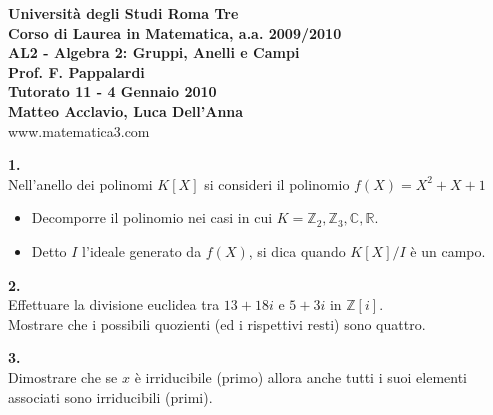\documentclass[italian,a4paper,11pt]
{article}
\newcommand{\Z}{\mathbb Z}
\newcommand{\R}{\mathbb{R}}
\newcommand{\C}{\mathbb{C}}
\newcommand{\acc}{\`}
\begin{document}
\begin{center}

\textbf{Universit\`a degli Studi Roma Tre}\\

\textbf{Corso di Laurea in Matematica, a.a. 2009/2010}\\

\textbf{AL2 - Algebra 2: Gruppi, Anelli e Campi}\\

\textbf{Prof. F. Pappalardi}\\

\textbf{Tutorato 11 - 4 Gennaio 2010}\\

\textbf{Matteo Acclavio, Luca Dell'Anna}\\

www.matematica3.com\\
\end{center}



\vspace{0.4cm}



\vspace{0.4 cm}
\noindent
\begin{Ex}\textbf{ 1.}\\
Nell'anello dei polinomi $K[X]$ si consideri il polinomio $f(X) = X^2 + X + 1$
\begin{itemize}
\item Decomporre il polinomio nei casi in cui $K = \Z_2, \Z_3,\C,\R.$
\item Detto $I$ l'ideale generato da $f(X)$, si dica quando $K[X]/I$ \acc e un campo.
\end{itemize}
\end{Ex}

\vspace{0.4 cm}
\noindent
\begin{Ex}\textbf{ 2.}\\
Effettuare la divisione euclidea tra $13 + 18i$ e $5 + 3i$ in $\Z[i]$.\\ Mostrare che i possibili
quozienti (ed i rispettivi resti) sono quattro.
\end{Ex}


\vspace{0.4 cm}
\noindent
\begin{Ex}\textbf{ 3.}\\
Dimostrare che se $x$ \acc e irriducibile (primo) allora anche tutti i suoi elementi
associati sono irriducibili (primi).
\end{Ex}
\end{document}
